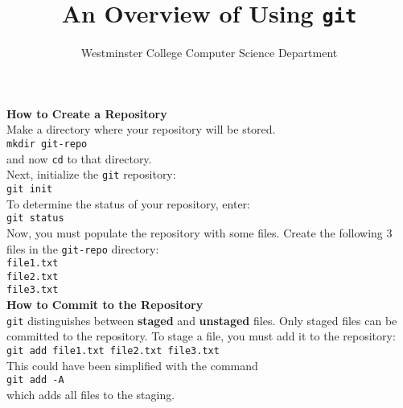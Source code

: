 \documentclass[11pt]{article}
\title{An Overview of Using {\tt git}}
\author{Westminster College Computer Science Department}
\begin{document}
\maketitle

\newpage

\noindent
{\bf How to Create a Repository} \\

\noindent
Make a directory where your repository will be stored. \\

{\tt mkdir git-repo} \\

\noindent
and now {\tt cd} to that directory. \\ 

\noindent
Next, initialize the {\tt git} repository: \\

{\tt git init} \\

\noindent
To determine the status of your repository, enter: \\

{\tt git status} \\

\noindent
Now, you must populate the repository with some files. Create the following 3 files in the {\tt git-repo} directory: \\

{\tt file1.txt} \\ 

{\tt file2.txt} \\ 

{\tt file3.txt} \\ 

\noindent
{\bf How to Commit to the Repository} \\

\noindent
{\tt git} distinguishes between {\bf staged} and {\bf unstaged} files. Only staged files can be committed to the repository. To stage a file, you must add it to the repository: \\

{\tt git add file1.txt file2.txt file3.txt} \\

\noindent
This could have been simplified with the command \\

{\tt git add -A} \\

\noindent
which adds all files to the staging. \\
\end{document}

